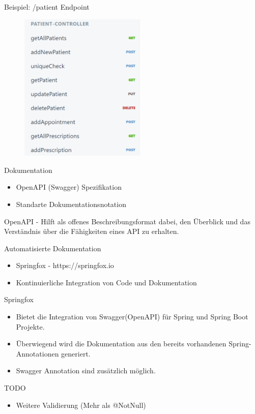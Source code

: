 \documentclass{beamer}
\begin{document}
\begin{frame}{Beispiel: /patient Endpoint}
	
	\begin{figure}
		\href{https://termin-api.docs.stoplight.io/patient-controller}{\includegraphics[width=60mm]{patient_endpoint.png}}
	\end{figure}
	
\end{frame}

\begin{frame}{Dokumentation}
	
	\begin{itemize}
		\item OpenAPI (Swagger) Spezifikation
		\item Standarte Dokumentationsnotation
	\end{itemize}
	
	\vskip 1cm
	
	\begin{block}{OpenAPI}
		- Hilft als offenes Beschreibungsformat dabei, den Überblick und das Verständnis über die Fähigkeiten eines API zu erhalten.
	\end{block}
	
\end{frame}

\begin{frame}{Automatisierte Dokumentation}
	
	\begin{itemize}
		\item Springfox - https://springfox.io
		\item Kontinuierliche Integration von Code und Dokumentation
	\end{itemize}
	
	\vskip 1cm
	
	\begin{block}{Springfox}
		\begin{itemize}
			\item Bietet die Integration von Swagger(OpenAPI) für Spring und Spring Boot Projekte.
			\item Überwiegend wird die Dokumentation aus den bereits vorhandenen Spring-Annotationen generiert.
			\item Swagger Annotation sind zusätzlich möglich.
		\end{itemize}
	\end{block}
	
\end{frame}

\begin{frame}{TODO}
	
	\begin{itemize}
		\item Weitere Validierung (Mehr als @NotNull)
	\end{itemize}
	
\end{frame}
\end{document}
